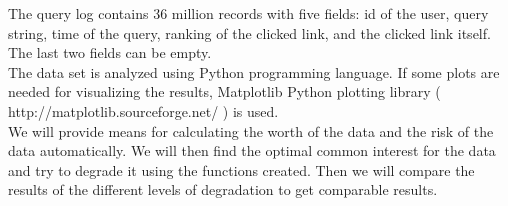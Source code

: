 \documentclass[a4paper,12pt,oneside,fleqn]{article}
\begin{document}
The query log contains 36 million records with five fields: id of the
user, query string, time of the query, ranking of the clicked link,
and the clicked link itself. The last two fields can be empty.\\

The data set is analyzed using Python programming language. If some
plots are needed for visualizing the results, Matplotlib Python
plotting library ( http://matplotlib.sourceforge.net/ ) is used.\\

We will provide means for calculating the worth of the data and the
risk of the data automatically. We will then find the optimal common
interest for the data and try to degrade it using the functions
created. Then we will compare the results of the different levels of
degradation to get comparable results.

\nocite{*}


\end{document}
